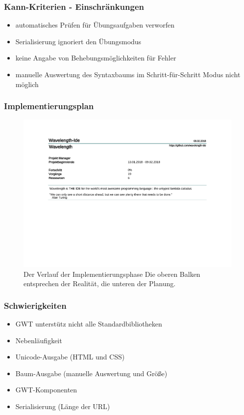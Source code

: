 \documentclass[10pt]{beamer}
\begin{document}
\begin{frame}
\frametitle{Kann-Kriterien - \alert{Einschränkungen}}
\begin{itemize}
\item automatisches Prüfen für Übungsaufgaben verworfen
\item Serialisierung ignoriert den Übungsmodus
\item keine Angabe von Behebungsmöglichkeiten für Fehler
\item manuelle Auswertung des Syntaxbaums im Schritt-für-Schritt Modus nicht möglich
\end{itemize}
\end{frame}

\begin{frame}
\frametitle{Implementierungsplan}
\begin{figure}[h]
\includegraphics[trim={0, 7cm, 0, 0}, clip, scale=0.4, page=4]{Implementierungsplan/Implementierungsplan.pdf}
\caption[caption]{Der Verlauf der Implementierungsphase 
\newline
Die oberen Balken entsprechen der Realität, die unteren der Planung.}
\end{figure}
\end{frame}

\begin{frame}
\frametitle{Schwierigkeiten}
\begin{itemize}
\item GWT unterstütz nicht alle Standardbibliotheken
\item Nebenläufigkeit
\item Unicode-Ausgabe (HTML und CSS)
\item Baum-Ausgabe (manuelle Auswertung und Größe)
\item GWT-Komponenten
\item Serialisierung (Länge der URL)
\end{itemize}
\end{frame}
\end{document}
